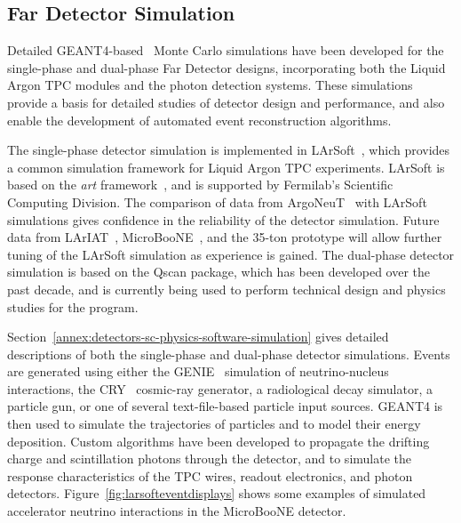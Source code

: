 \subsection{Far Detector Simulation}
\label{sec:detectors-sc-physics-software-simulation-fd}

Detailed GEANT4-based~\cite{GEANT4:NIM,GEANT4} Monte Carlo simulations have been 
developed for the single-phase and dual-phase Far Detector designs,
incorporating both the Liquid Argon TPC modules
and the photon detection systems. These simulations provide
a basis for detailed studies of detector design and performance, 
and also enable the development of automated event reconstruction algorithms.

The single-phase detector simulation is implemented in LArSoft~\cite{Church:2013hea},
which provides a common simulation framework for Liquid Argon TPC experiments.
LArSoft is based on the {\it art} framework~\cite{Green:2012gv}, and is supported by Fermilab's
Scientific Computing Division.
The comparison of data from ArgoNeuT~\cite{Anderson:2012vc} with LArSoft
simulations gives confidence in the reliability of the detector simulation.
Future data from LArIAT~\cite{Adamson:2013/02/28tla,Cavanna:2014iqa},
MicroBooNE~\cite{Chen:2007ae,Jones:2011ci,microboonecdr}, and the 35-ton prototype will allow
further tuning of the LArSoft simulation as experience is gained.
The dual-phase detector simulation is based on the Qscan package,
which has been developed over the past decade, and is currently
being used to perform technical design and physics studies for
the \cerndualproto{} program.

Section~\ref{annex:detectors-sc-physics-software-simulation} gives detailed
descriptions of both the single-phase and dual-phase detector simulations.
Events are generated using either the GENIE~\cite{GENIE} simulation of 
neutrino-nucleus interactions, the CRY~\cite{Cosmic-CRY,Cosmic-CRY-protons,CRY-url} cosmic-ray generator, 
a radiological decay simulator, a particle gun, or one of several
text-file-based particle input sources. GEANT4 is then used to simulate the trajectories
of particles and to model their energy deposition.  
Custom algorithms have been developed to propagate the drifting charge
and scintillation photons through the detector, and to simulate the
response characteristics of the TPC wires, readout electronics, and photon detectors.
Figure~\ref{fig:larsofteventdisplays} shows some examples of simulated 
accelerator neutrino interactions in the MicroBooNE detector.

